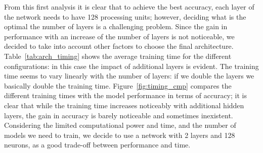 \begin{table}[]
\centering
{}
\caption{LSTM architectures comparison.}
\label{tab:arch_results}
\end{table}

From this first analysis it is clear that to achieve the best accuracy, each layer of the network needs to have 128 processing units; however, deciding what is the optimal the number of layers is a challenging problem. Since the gain in performance with an increase of the number of layers is not noticeable, we decided to take into account other factors to choose the final architecture. Table~\ref{tab:arch_timing} shows the average training time for the different configurations: in this case the impact of additional layers is evident. The training time seems to vary linearly with the number of layers: if we double the layers we basically double the training time.
Figure~\ref{fig:timing_cmp} compares the different training times with the model performance in terms of accuracy;
it is clear that while the training time increases noticeably with additional hidden layers, the gain in accuracy is barely noticeable and sometimes inexistent. Considering the limited computational power and time, and the number of models we need to train, we decide to use a network with 2 layers and 128 neurons, as a good trade-off between performance and time.

